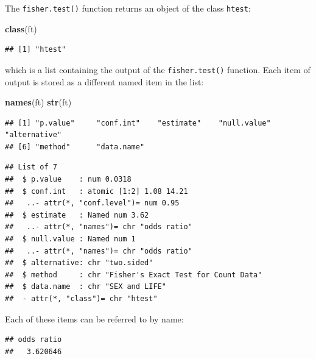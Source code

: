 \documentclass[]{book}
\newenvironment{Shaded}{\begin{snugshade}}{\end{snugshade}}
\newcommand{\KeywordTok}[1]{\textcolor[rgb]{0.13,0.29,0.53}{\textbf{#1}}}
\newcommand{\OperatorTok}[1]{\textcolor[rgb]{0.81,0.36,0.00}{\textbf{#1}}}
\newcommand{\NormalTok}[1]{#1}
\theoremstyle{definition}
\theoremstyle{definition}
\theoremstyle{definition}
\theoremstyle{remark}
\begin{document}
The \texttt{fisher.test()} function returns an object of the class
\texttt{htest}:

\begin{Shaded}
\begin{Highlighting}[]
\KeywordTok{class}\NormalTok{(ft)}
\end{Highlighting}
\end{Shaded}

\begin{verbatim}
## [1] "htest"
\end{verbatim}

which is a list containing the output of the \texttt{fisher.test()}
function. Each item of output is stored as a different named item in the
list:

\begin{Shaded}
\begin{Highlighting}[]
\KeywordTok{names}\NormalTok{(ft)}
\KeywordTok{str}\NormalTok{(ft)}
\end{Highlighting}
\end{Shaded}

\begin{verbatim}
## [1] "p.value"     "conf.int"    "estimate"    "null.value"  "alternative"
## [6] "method"      "data.name"
\end{verbatim}

\begin{verbatim}
## List of 7
##  $ p.value    : num 0.0318
##  $ conf.int   : atomic [1:2] 1.08 14.21
##   ..- attr(*, "conf.level")= num 0.95
##  $ estimate   : Named num 3.62
##   ..- attr(*, "names")= chr "odds ratio"
##  $ null.value : Named num 1
##   ..- attr(*, "names")= chr "odds ratio"
##  $ alternative: chr "two.sided"
##  $ method     : chr "Fisher's Exact Test for Count Data"
##  $ data.name  : chr "SEX and LIFE"
##  - attr(*, "class")= chr "htest"
\end{verbatim}

Each of these items can be referred to by name:

\begin{Shaded}
\end{Shaded}

\begin{verbatim}
## odds ratio 
##   3.620646
\end{verbatim}
\end{document}
